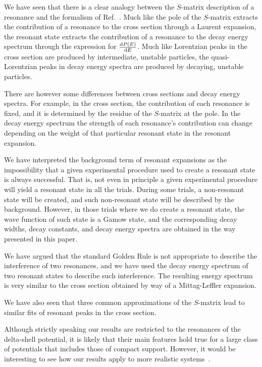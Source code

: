 \documentclass[12pt]{article}
\newcommand{\rmd}{{\rm d}}
\begin{document}
We have seen that
there is a clear analogy between the $S$-matrix description of a resonance
and the formalism of Ref.~\cite{NPA15}. Much like the pole of the $S$-matrix 
extracts the contribution of a resonance to the cross section through a 
Laurent expansion, the resonant state extracts the contribution of a
resonance to the decay energy spectrum through the expression 
for $\frac{\rmd P(E)}{\rmd E}$. Much like Lorentzian
peaks in the cross section are produced by intermediate, unstable particles,
the quasi-Lorentzian peaks in decay energy spectra are produced by
decaying, unstable particles. 

There are however some differences between cross sections and decay
energy spectra. For example, in the cross section, the contribution of 
each resonance is fixed, and it is 
determined by the residue of the $S$-matrix at the pole. In the decay energy 
spectrum the strength of each resonance's
contribution can change depending on the weight of that particular
resonant state in the resonant expansion.

We have interpreted the background term of resonant expansions as the
impossibility that a given experimental procedure used to create a 
resonant state is always
successful. That is, not even in principle a given
experimental procedure will yield a resonant state in all the trials. During
some trials, a non-resonant state will be created, and such
non-resonant state will be described by the background. However, in those
trials where we do create a resonant state, the wave function of such
state is a Gamow state, and the corresponding decay widths,
decay constants, and decay energy spectra are obtained in the
way presented in this paper.

We have argued that the standard Golden Rule is not appropriate to describe
the interference of two resonances, and we have used the decay energy
spectrum of two resonant states to describe such interference. The resulting
energy spectrum is very similar to the cross section obtained
by way of a Mittag-Leffler expansion.

We have also seen that three common approximations of the $S$-matrix
lead to similar fits of resonant peaks in the cross section.

Although strictly speaking our results are restricted to the resonances
of the delta-shell potential, it is likely that their main features hold true
for a large class of potentials that includes those of compact 
support. However, it would be interesting to see how our results apply
to more realistic 
systems~\cite{MICHEL7,KAMANO15,MIYAHARA16,KAMANOPRC16,KAMANOPRC16b,FLORES}.
\end{document}
